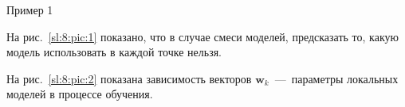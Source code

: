 \documentclass[9pt,pdf,hyperref={unicode}]{beamer}
\begin{document}
\begin{frame}{Пример 1}
\justifying
\begin{figure}
\end{figure}
На рис.~\ref{sl:8:pic:1} показано, что в случае смеси моделей, предсказать то, какую модель использовать в каждой точке нельзя.

На рис.~\ref{sl:8:pic:2} показана зависимость векторов $\mathbf{w}_{k}$~---~параметры локальных моделей в процессе обучения.

\end{frame}
\end{document}
